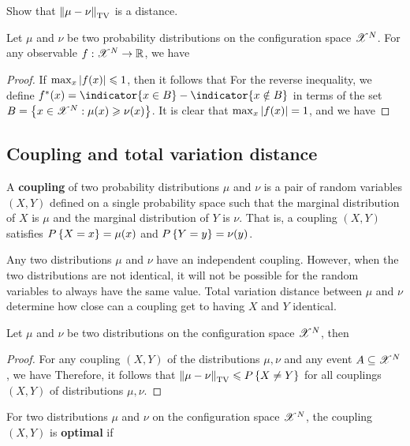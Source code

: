 \documentclass[letterpaper,english,10pt]{article}
\begin{document}
\begin{exerc}
Show that $\left\lVert\mu-\nu\right\rVert_{\text{TV}}$ is a distance.  
\end{exerc}
\begin{prop}
Let $\mu$ and $\nu$ be two probability distributions on the configuration space $\mathscr{X}^N$. 
For any observable $f: \mathscr{X}^N \to \mathbb{R}$, we have 
\end{prop}
\begin{proof}
If $\max_x\left\lvert f(x)\right\rvert \leqslant 1$, then it follows that 
For the reverse inequality, we define $f^{\ast}(x) = \indicator{x \in B}-\indicator{x \notin B}$ in terms of the set $B = \left\{x \in \mathscr{X}^N: \mu(x) \geqslant \nu(x)\right\}$. 
It is clear that $\max_x\left\lvert f(x)\right\rvert = 1$, and we have 
\end{proof}
\subsection{Coupling and total variation distance}
\begin{defn}
A \textbf{coupling} of two probability distributions $\mu$ and $\nu$ is a pair of random variables $(X, Y)$ 
defined on a single probability space such that the marginal distribution of $X$ is $\mu$ and the marginal distribution of $Y$ is $\nu$. 
That is, a coupling $(X, Y)$ satisfies $P\left\{X = x\right\} = \mu(x)$ and $P\left\{Y = y\right\} = \nu(y)$. 
\end{defn}

Any two distributions $\mu$ and $\nu$ have an independent coupling. 
However, when the two distributions are not identical, 
it will not be possible for the random variables to always have the same value. 
Total variation distance between $\mu$ and $\nu$ determine how close can a coupling get to having $X$ and $Y$ identical. 
\begin{prop}
Let $\mu$ and $\nu$ be two distributions on the configuration space $\mathscr{X}^N$, then 
\end{prop}
\begin{proof}
For any coupling $(X,Y)$ of the distributions $\mu, \nu$ and any event $A \subseteq \mathscr{X}^N$, we have 
Therefore, it follows that $\left\lVert\mu-\nu\right\rVert_{\text{TV}}  \leqslant P\left\{X\neq Y\right\}$ for all  couplings $(X,Y)$ of distributions $\mu, \nu$. 
\end{proof}
\begin{defn}
For two distributions $\mu$ and $\nu$ on the configuration space $\mathscr{X}^N$, 
the coupling $(X,Y)$ is \textbf{optimal} if  
\end{defn}
\end{document}
